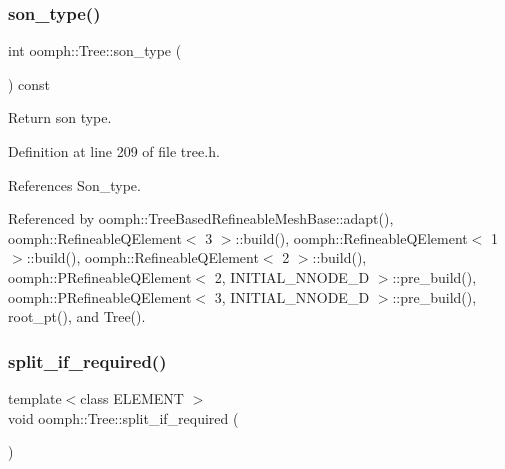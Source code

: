 \mbox{\label{classoomph_1_1Tree_a7537f8fe7c896d2220eb2da03567b34d}} 
\subsubsection{\texorpdfstring{son\+\_\+type()}{son\_type()}}
{\footnotesize\ttfamily int oomph\+::\+Tree\+::son\+\_\+type (\begin{DoxyParamCaption}{ }\end{DoxyParamCaption}) const\hspace{0.3cm}{\ttfamily [inline]}}



Return son type. 



Definition at line 209 of file tree.\+h.



References Son\+\_\+type.



Referenced by oomph\+::\+Tree\+Based\+Refineable\+Mesh\+Base\+::adapt(), oomph\+::\+Refineable\+Q\+Element$<$ 3 $>$\+::build(), oomph\+::\+Refineable\+Q\+Element$<$ 1 $>$\+::build(), oomph\+::\+Refineable\+Q\+Element$<$ 2 $>$\+::build(), oomph\+::\+P\+Refineable\+Q\+Element$<$ 2, I\+N\+I\+T\+I\+A\+L\+\_\+\+N\+N\+O\+D\+E\+\_\+D $>$\+::pre\+\_\+build(), oomph\+::\+P\+Refineable\+Q\+Element$<$ 3, I\+N\+I\+T\+I\+A\+L\+\_\+\+N\+N\+O\+D\+E\+\_\+D $>$\+::pre\+\_\+build(), root\+\_\+pt(), and Tree().

\mbox{\label{classoomph_1_1Tree_a975ccfd63ffa14a04f14a37b3d2ff931}} 
\subsubsection{\texorpdfstring{split\+\_\+if\+\_\+required()}{split\_if\_required()}}
{\footnotesize\ttfamily template$<$class E\+L\+E\+M\+E\+NT $>$ \\
void oomph\+::\+Tree\+::split\+\_\+if\+\_\+required (\begin{DoxyParamCaption}{ }\end{DoxyParamCaption})}



